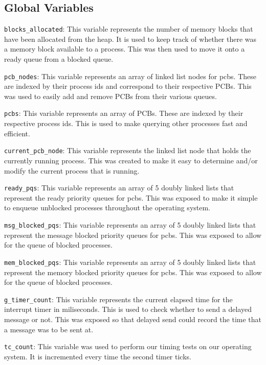 \documentclass[se]{uw-wkrpt}
\begin{document}
\appendix
\begin{appendices}

\section{Global Variables}

\texttt{blocks\_allocated}: This variable represents the number of memory blocks that have been allocated from the heap. It is used to keep track of whether there was a memory block available to a process. This was then used to move it onto a ready queue from a blocked queue.

\texttt{pcb\_nodes}: This variable represents an array of linked list nodes for pcbs. These are indexed by their process ids and correspond to their respective PCBs. This was used to easily add and remove PCBs from their various queues.

\texttt{pcbs}: This variable represents an array of PCBs. These are indexed by their respective process ids. This is used to make querying other processes fast and efficient.

\texttt{current\_pcb\_node}: This variable represents the linked list node that holds the currently running process. This was created to make it easy to determine and/or modify the current process that is running.

\texttt{ready\_pqs}: This variable represents an array of 5 doubly linked lists that represent the ready priority queues for pcbs. This was exposed to make it simple to enqueue unblocked processes throughout the operating system.

\texttt{msg\_blocked\_pqs}: This variable represents an array of 5 doubly linked lists that represent the message blocked priority queues for pcbs. This was exposed to allow for the queue of blocked processes.

\texttt{mem\_blocked\_pqs}: This variable represents an array of 5 doubly linked lists that represent the memory blocked priority queues for pcbs. This was exposed to allow for the queue of blocked processes.

\texttt{g\_timer\_count}: This variable represents the current elapsed time for the interrupt timer in miliseconds. This is used to check whether to send a delayed message or not. This was exposed so that delayed send could record the time that a message was to be sent at.

\texttt{tc\_count}: This variable was used to perform our timing tests on our operating system. It is incremented every time the second timer ticks.

\end{appendices}
\end{document}
